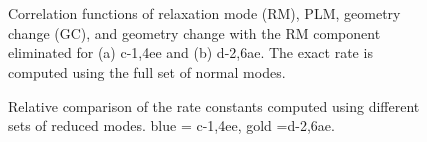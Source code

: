 \begin{figure}[!h]
\\
\\
\caption{Correlation functions of relaxation mode (RM), PLM, geometry change (GC), and geometry change with the RM component eliminated for (a) c-1,4ee and (b) d-2,6ae. The exact rate is computed using the full set of normal modes.}
\label{Corr}
\end{figure}


\begin{figure}[!h]
\caption{Relative comparison of the rate constants computed using different sets of reduced modes. blue = c-1,4ee, gold =d-2,6ae. }
\label{RateComp}
\end{figure}

